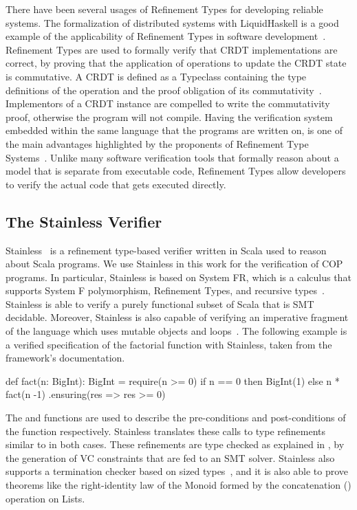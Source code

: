 There have been several usages of Refinement Types for developing reliable systems. The formalization of distributed systems with 
LiquidHaskell is a good example of the  applicability of Refinement Types in software 
development~\cite{kuper22,liittschwager25}. Refinement Types are used to formally verify that CRDT 
implementations are correct, by proving that the application of operations to update the CRDT state is 
commutative. A CRDT is defined as a Typeclass containing the type definitions of the operation and 
the proof obligation of its commutativity~\cite{kuper22}. Implementors of a CRDT instance are 
compelled to write the commutativity proof, otherwise the program will not compile. Having the 
verification system embedded within the same language that the programs are written on, is one of the 
main advantages highlighted by the proponents of Refinement Type Systems~\cite{jhala21}. Unlike 
many software verification tools that formally reason about a model that is separate from executable 
code, Refinement Types allow developers to verify the actual code that gets executed directly.


\subsection{The Stainless Verifier}
\label{sec:stainless}

Stainless~\cite{hamza19} is a refinement type-based verifier written in Scala used to reason about 
Scala programs. We use Stainless in this work for the verification of \ac{COP} programs. In particular, 
Stainless is based on System FR, which is a calculus that supports System F polymorphism, 
Refinement Types, and recursive types~\cite{hamza19}. Stainless is able to verify a purely functional 
subset of Scala that is SMT decidable. Moreover, Stainless is also capable of verifying an imperative 
fragment of the language which uses mutable objects and loops~\cite{hamza19}. The following 
example is a verified specification of the factorial function with Stainless, taken from the framework's 
documentation.

\begin{scala}
  def fact(n: BigInt): BigInt = {
    require(n >= 0)
    if n == 0 then BigInt(1) else n * fact(n -1)
  }.ensuring(res => res >= 0)
\end{scala}

The  and  functions are used to describe the pre-conditions and 
post-conditions of the  function respectively. Stainless translates these calls to type 
refinements similar to  in both cases. These refinements are type 
checked as explained in , by the generation of \ac{VC} constraints that are 
fed to an \ac{SMT} solver. Stainless also supports a termination checker based on sized 
types~\cite{hamza19}, and it is also able to prove theorems like the right-identity law of the Monoid 
formed by the concatenation (\scode{++}) operation on Lists.

